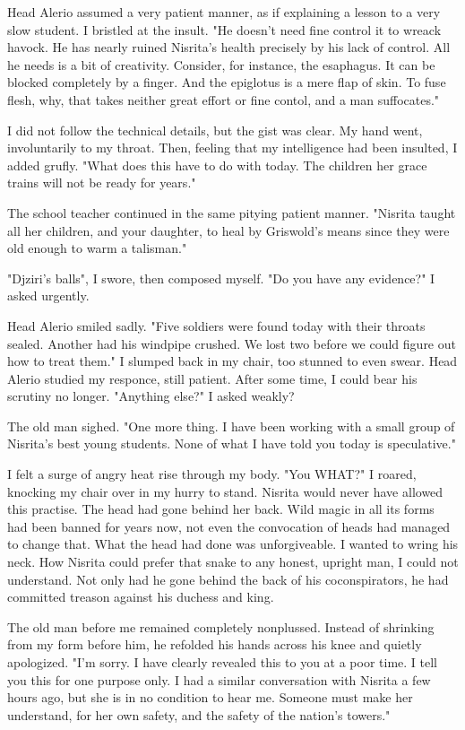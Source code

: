 \documentclass{article}
\begin{document}
Head Alerio assumed a very patient manner, as if explaining a lesson to a very slow student. I bristled at the insult. "He doesn't need fine control it to wreack havock. He has nearly ruined Nisrita's health precisely by his lack of control. All he needs is a bit of creativity. Consider, for instance, the esaphagus. It can be blocked completely by a finger. And the epiglotus is a mere flap of skin. To fuse flesh, why, that takes neither great effort or fine contol, and a man suffocates."

I did not follow the technical details, but the gist was clear. My hand went, involuntarily to my throat. Then, feeling that my intelligence had been insulted, I added grufly. "What does this have to do with today. The children her grace trains will not be ready for years."

The school teacher continued in the same pitying patient manner. "Nisrita taught all her children, and your daughter, to heal by Griswold's means since they were old enough to warm a talisman."

"Djziri's balls", I swore, then composed myself. "Do you have any evidence?" I asked urgently.

Head Alerio smiled sadly. "Five soldiers were found today with their throats sealed. Another had his windpipe crushed. We lost two before we could figure out how to treat them." I slumped back in my chair, too stunned to even swear. Head Alerio studied my responce, still patient. After some time, I could bear his scrutiny no longer. "Anything else?" I asked weakly?

The old man sighed. "One more thing. I have been working with a small group of Nisrita's best young students. None of what I have told you today is speculative."

I felt a surge of angry heat rise through my body. "You WHAT?" I roared, knocking my chair over in my hurry to stand. Nisrita would never have allowed this practise. The head had gone behind her back. Wild magic in all its forms had been banned for years now, not even the convocation of heads had managed to change that. What the head had done was unforgiveable. I wanted to wring his neck. How Nisrita could prefer that snake to any honest, upright man, I could not understand. Not only had he gone behind the back of his coconspirators,  he had committed treason against his duchess and king.

The old man before me remained completely nonplussed. Instead of shrinking from my form before him, he refolded his hands across his knee and quietly apologized. "I'm sorry. I have clearly revealed this to you at a poor time. I tell you this for one purpose only. I had a similar conversation with Nisrita a few hours ago, but she is in no condition to hear me. Someone must make her understand, for her own safety, and the safety of the nation's towers."
\end{document}

